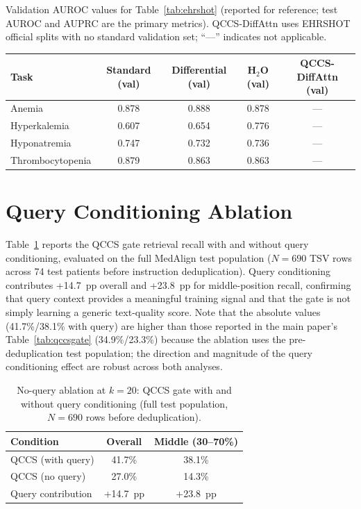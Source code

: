\documentclass{article}
\begin{document}
Validation AUROC values for Table~\ref{tab:ehrshot} (reported for reference;
test AUROC and AUPRC are the primary metrics). QCCS-DiffAttn uses EHRSHOT
official splits with no standard validation set; ``---'' indicates not applicable.

\begin{center}
\small
\begin{tabular}{@{}lcccc@{}}
\toprule
Task & Standard (val) & Differential (val) & H$_2$O (val) & QCCS-DiffAttn (val) \\
\midrule
Anemia         & 0.878 & 0.888 & 0.878 & --- \\
Hyperkalemia   & 0.607 & 0.654 & 0.776 & --- \\
Hyponatremia   & 0.747 & 0.732 & 0.736 & --- \\
Thrombocytopenia & 0.879 & 0.863 & 0.863 & --- \\
\bottomrule
\end{tabular}
\end{center}

\section{Query Conditioning Ablation}
\label{app:noquery}

Table~\ref{tab:ablation_noq} reports the QCCS gate retrieval recall with and
without query conditioning, evaluated on the full MedAlign test population
($N{=}690$ TSV rows across 74 test patients before instruction deduplication).
Query conditioning contributes +14.7~pp overall and +23.8~pp for middle-position
recall, confirming that query context provides a meaningful training signal and
that the gate is not simply learning a generic text-quality score. Note that
the absolute values (41.7\%/38.1\% with query) are higher than those reported
in the main paper's Table~\ref{tab:qccsgate} (34.9\%/23.3\%) because the
ablation uses the pre-deduplication test population; the direction and magnitude
of the query conditioning effect are robust across both analyses.

\begin{table}[H]
\centering
\caption{No-query ablation at $k{=}20$: QCCS gate with and without query
  conditioning (full test population, $N{=}690$ rows before deduplication).}
\label{tab:ablation_noq}
\small
\begin{tabular}{@{}lcc@{}}
\toprule
Condition & Overall & Middle (30--70\%) \\
\midrule
QCCS (with query) & 41.7\% & 38.1\% \\
QCCS (no query)   & 27.0\% & 14.3\% \\
\midrule
Query contribution & +14.7~pp & +23.8~pp \\
\bottomrule
\end{tabular}
\end{table}
\end{document}
